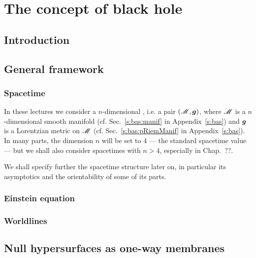 \chapter{The concept of black hole}

\minitoc

\section{Introduction}

\section{General framework}

\subsection{Spacetime}

In these lectures we consider a $n$-dimensional ,
i.e. a pair $(\mathscr{M}, \bm{g})$, where $\mathscr{M}$ is a $n$-dimensional smooth manifold
(cf. Sec.~\ref{s:bas:manif} in Appendix~\ref{s:bas}) and $\bm{g}$ is a
Lorentzian metric on $\mathscr{M}$ (cf. Sec.~\ref{s:bas:pRiemManif} in
Appendix~\ref{s:bas}). In many parts, the dimension $n$ will be set to 4
--- the standard spacetime value --- but we shall also consider spacetimes with
$n>4$, especially in Chap.~??.

We shall specify further the spacetime structure later on, in particular its
asymptotics and the orientability of some of its parts.

\subsection{Einstein equation}


\subsection{Worldlines}



\section{Null hypersurfaces as one-way membranes}

